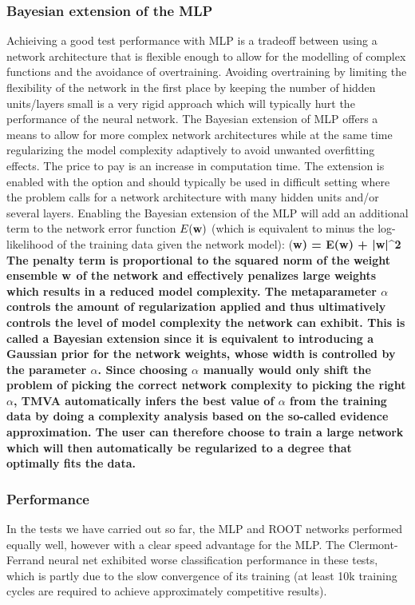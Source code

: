 \subsubsection{Bayesian extension of the MLP}
\label{sec:ann:bayes}
Achieiving a good test performance with MLP is a tradeoff between using a network architecture that is flexible enough to allow for the modelling of complex functions and the avoidance of overtraining. Avoiding overtraining by limiting the flexibility of the network in the first place by keeping the number of hidden units/layers small is a very rigid approach which will typically hurt the performance of the neural network. The Bayesian extension of MLP offers a means to allow for more complex network architectures while at the same time regularizing the model complexity adaptively to avoid unwanted overfitting effects. The price to pay is an increase in computation time. The extension is enabled with the option  and should typically be used in difficult setting where the problem calls for a network architecture with many hidden units and/or several layers.
Enabling the Bayesian extension of the MLP will add an additional term to the network error function $E(\bf w)$ (which is equivalent to minus the log-likelihood of the training data given the network model):
\beq
  \label{eq:mlp:penalty}
	(\bf w) = E(\bf w) + \alpha\bf |w|^2
\eeq
The penalty term is proportional to the squared norm of the weight ensemble $\bf w$ of the network and effectively penalizes large weights which results in a reduced model complexity. The metaparameter $\alpha$ controls the amount of regularization applied and thus ultimatively controls the level of model complexity the network can exhibit. This is called a Bayesian extension since it is equivalent to introducing a Gaussian prior for the network weights, whose width is controlled by the parameter $\alpha$. Since choosing $\alpha$ manually would only shift the problem of picking the correct network complexity to picking the right $\alpha$, TMVA automatically infers the best value of $\alpha$ from the training data by doing a complexity analysis based on the so-called evidence approximation. The user can therefore choose to train a large network which will then automatically be regularized to a degree that optimally fits the data.

\subsubsection{Performance}
\label{sec:ann:perf}

In the tests we have carried out so far, the MLP and ROOT networks performed equally well,
however with a clear speed advantage for the MLP. The Clermont-Ferrand neural net
exhibited worse classification performance in these tests, which is partly due to the slow
convergence of its training (at least 10k training cycles are required to achieve
approximately competitive results).


